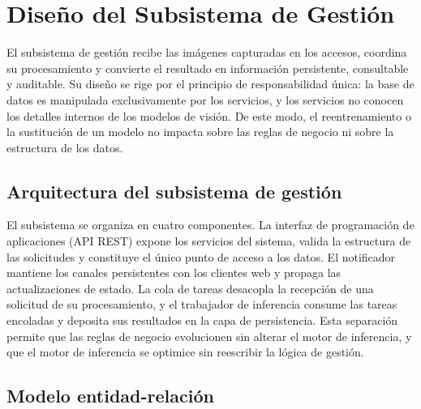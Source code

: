 \section{Diseño del Subsistema de Gestión}

El subsistema de gestión recibe las imágenes capturadas en los accesos, coordina
su procesamiento y convierte el resultado en información persistente,
consultable y auditable. Su diseño se rige por el principio de responsabilidad
única: la base de datos es manipulada exclusivamente por los servicios, y los
servicios no conocen los detalles internos de los modelos de visión. De este
modo, el reentrenamiento o la sustitución de un modelo no impacta sobre las
reglas de negocio ni sobre la estructura de los datos.

\subsection{Arquitectura del subsistema de gestión}

El subsistema se organiza en cuatro componentes. La interfaz de programación de
aplicaciones (API REST) expone los servicios del sistema, valida la estructura
de las solicitudes y constituye el único punto de acceso a los datos. El
notificador mantiene los canales persistentes con los clientes web y propaga las
actualizaciones de estado. La cola de tareas desacopla la recepción de una
solicitud de su procesamiento, y el trabajador de inferencia consume las tareas
encoladas y deposita sus resultados en la capa de persistencia. Esta separación
permite que las reglas de negocio evolucionen sin alterar el motor de
inferencia, y que el motor de inferencia se optimice sin reescribir la lógica de
gestión.

\subsection{Modelo entidad-relación}

